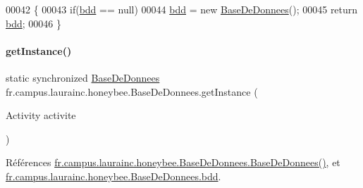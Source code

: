 \begin{DoxyCode}
00042     \{
00043         \textcolor{keywordflow}{if}(\hyperlink{classfr_1_1campus_1_1laurainc_1_1honeybee_1_1_base_de_donnees_a6afcd3f4c69f15afa0c675a848bf97a7}{bdd} == null)
00044             \hyperlink{classfr_1_1campus_1_1laurainc_1_1honeybee_1_1_base_de_donnees_a6afcd3f4c69f15afa0c675a848bf97a7}{bdd} = \textcolor{keyword}{new} \hyperlink{classfr_1_1campus_1_1laurainc_1_1honeybee_1_1_base_de_donnees_ac4d0c514f439b3a19dc35c159955373a}{BaseDeDonnees}();
00045         \textcolor{keywordflow}{return} \hyperlink{classfr_1_1campus_1_1laurainc_1_1honeybee_1_1_base_de_donnees_a6afcd3f4c69f15afa0c675a848bf97a7}{bdd};
00046     \}
\end{DoxyCode}
\mbox{\label{classfr_1_1campus_1_1laurainc_1_1honeybee_1_1_base_de_donnees_a1946bd458844214e84a5bc1327bbd174}} 
\paragraph{\texorpdfstring{get\+Instance()}{getInstance()}\hspace{0.1cm}{\footnotesize\ttfamily [2/4]}}
{\footnotesize\ttfamily static synchronized \hyperlink{classfr_1_1campus_1_1laurainc_1_1honeybee_1_1_base_de_donnees}{Base\+De\+Donnees} fr.\+campus.\+laurainc.\+honeybee.\+Base\+De\+Donnees.\+get\+Instance (\begin{DoxyParamCaption}\item[{Activity}]{activite }\end{DoxyParamCaption})\hspace{0.3cm}{\ttfamily [static]}}



Références \hyperlink{classfr_1_1campus_1_1laurainc_1_1honeybee_1_1_base_de_donnees_ac4d0c514f439b3a19dc35c159955373a}{fr.\+campus.\+laurainc.\+honeybee.\+Base\+De\+Donnees.\+Base\+De\+Donnees()}, et \hyperlink{classfr_1_1campus_1_1laurainc_1_1honeybee_1_1_base_de_donnees_a6afcd3f4c69f15afa0c675a848bf97a7}{fr.\+campus.\+laurainc.\+honeybee.\+Base\+De\+Donnees.\+bdd}.


